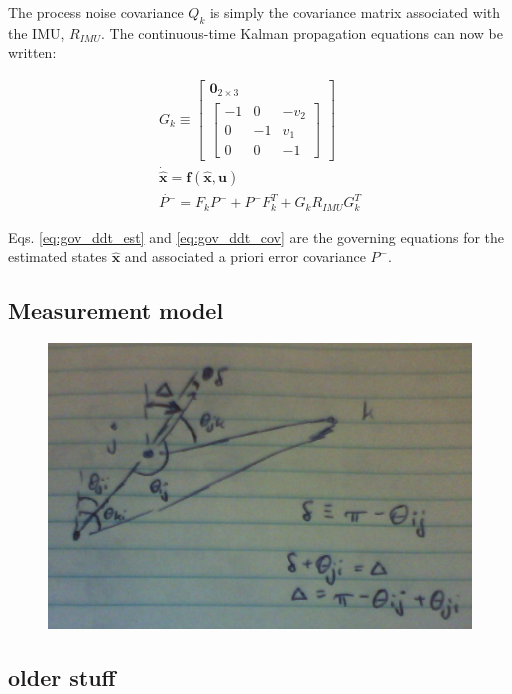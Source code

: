 \documentclass{aiaa-tc}
\newcommand{\B}[1]{\textbf{#1}} %
\begin{document}
The process noise covariance $Q_k$ is simply the covariance matrix associated with the IMU, $R_{IMU}$. The continuous-time Kalman propagation equations can now be written:

\begin{align}
G_k \equiv \begin{bmatrix}
\B{0}_{2\times 3} \\
\begin{bmatrix}
-1 & 0 & -v_2 \\
0 & -1 & v_1 \\
0 & 0 & -1
\end{bmatrix}
\end{bmatrix} \\
\dot{\hat{\B{x}}} = \B{f}(\hat{\B{x}},\B{u}) \label{eq:gov_ddt_est}\\
\dot{P^{-}} = F_kP^{-} + P^{-}F_k^T + G_k R_{IMU} G_k^T \label{eq:gov_ddt_cov}
\end{align}

Eqs. \ref{eq:gov_ddt_est} and \ref{eq:gov_ddt_cov} are the governing equations for the estimated states $\hat{\B{x}}$ and associated a priori error covariance $P^-$.

\subsection{Measurement model}

\begin{figure}[tb!]
\includegraphics[width=\textwidth]{geometry.png}
\caption{}
\label{fig:geometry}
\end{figure}

\subsection{older stuff}
\end{document}
